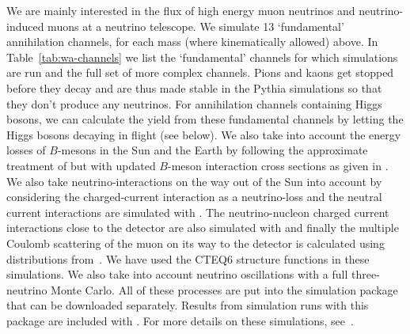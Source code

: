 We are mainly interested in the flux of high energy muon neutrinos
     and neutrino-induced muons at a neutrino telescope.  We simulate 13
     `fundamental' annihilation channels,      
for each mass
     (where kinematically allowed) above. In Table~\ref{tab:wa-channels} we list the `fundamental' channels for which simulations are run and the full set of more complex channels.
     Pions and kaons get stopped
     before they decay and are thus made stable in the {\sc Pythia}
     simulations so that they don't produce any neutrinos.  For
     annihilation channels containing Higgs bosons, we can calculate
     the yield from these fundamental channels by letting the Higgs
     bosons decaying in flight (see below).  We also take into account
     the energy losses of $B$-mesons in the Sun and the Earth by
     following the approximate treatment of \cite{Ritz:1987mh} but with updated
     $B$-meson interaction cross sections as given in
     \cite{Edsjo:1997hp}.  We also take neutrino-interactions on the
     way out of the Sun into account by considering the charged-current
     interaction as a neutrino-loss and the neutral current
     interactions are simulated with  \cite{Edsjo:2007ns}.  The
     neutrino-nucleon charged current interactions close to the
     detector are also simulated with  and finally the
     multiple Coulomb scattering of the muon on its way to the detector
     is calculated using distributions from~\cite{Groom:2000in}. We have used the CTEQ6
     structure functions in these simulations.
     We also take into account neutrino oscillations with a full three-neutrino Monte Carlo. All of these processes are put into the simulation package  \cite{Edsjo:2007ws} that can be downloaded separately. Results from simulation runs with this package are included with \ds.
     For more details on these simulations, see~\cite{Blennow:2007tw}.
     
